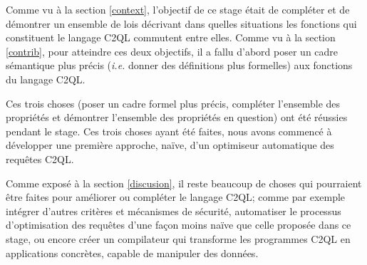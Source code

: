 Comme vu à la section \ref{context}, l'objectif
de ce stage était de compléter et de démontrer
un ensemble de lois décrivant dans quelles situations
les fonctions qui constituent le langage C2QL commutent
entre elles.
Comme vu à la section \ref{contrib}, pour atteindre ces
deux objectifs, il a fallu d'abord 
poser un cadre sémantique plus précis 
(\emph{i.e.} donner des définitions plus formelles)
aux fonctions du langage C2QL.

Ces trois choses (poser un cadre formel plus précis,
compléter l'ensemble des propriétés et démontrer 
l'ensemble des propriétés en question) ont été
réussies pendant le stage.
Ces trois choses ayant été faites, nous avons commencé
à développer une première approche, naïve, d'un optimiseur
automatique des requêtes C2QL.

Comme exposé à la section \ref{discusion},
il reste beaucoup de choses qui pourraient
être faites pour améliorer ou compléter le langage C2QL;
comme par exemple intégrer d'autres critères et mécanismes
de sécurité, automatiser le processus 
d'optimisation des requêtes d'une façon moins
naïve que celle proposée dans ce stage, ou
encore créer un compilateur qui transforme
les programmes C2QL en applications concrètes,
capable de manipuler des données.